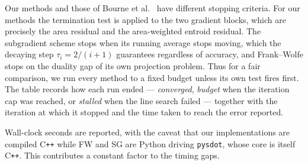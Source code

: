 Our methods and those of Bourne et al.~\cite{Bourne2026} have different
stopping criteria. For our methods the termination test is applied to the two
gradient blocks, which are precisely the area residual and the area-weighted
entroid residual.
The subgradient scheme stops when its running average stops moving, which the decaying step $\tau_i=2/(i+1)$ guarantees regardless of accuracy, and Frank--Wolfe stops on the duality gap of its own projection problem.
Thus for a fair comparison, we run every method to a fixed budget unless its own test
fires first. The table records how each run ended --- \emph{converged},
\emph{budget} when the iteration cap was reached, or \emph{stalled} when the
line search failed --- together with the iteration at which it stopped and the
time taken to reach the error reported.

Wall-clock seconds are reported, with the caveat that our implementations are
compiled C\texttt{++} while FW and SG are Python driving \texttt{pysdot},
whose core is itself C\texttt{++}. This contributes a constant factor to the
timing gaps.
 



